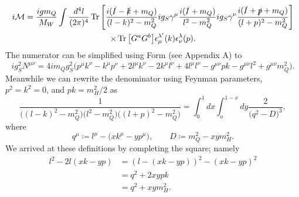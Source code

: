 \begin{gather}
  i\mathcal{M}=\frac{igm_Q}{M_W}\int\frac{d^4l}{(2\pi)^4}\Tr\left[
        \frac{i(\slashed{l}-\slashed{k}+m_Q)}{(l-k)^2-m_Q^2}ig_S\gamma^\mu
        \frac{i(\slashed{l}+m_Q)}{l^2-m_Q^2}ig_S\gamma^\nu
        \frac{i(\slashed{l}+\slashed{p}+m_Q)}{(l+p)^2-m_Q^2}\right] \\
        \times\Tr\big[G^aG^b\big]\epsilon^{\lambda '}_\mu(k)
                           \epsilon^{\lambda }_\nu(p).
\end{gather}
The numerator can be simplified using Form (see Appendix A) to
\begin{equation}
  \label{eq:3num}
  ig_S^2N^{\mu\nu}=4im_Qg_S^2\big(p^\mu k^\nu-k^\mu p^\nu+2l^\mu k^\nu
                     -2k^\mu l^\nu+4l^\mu l^\nu-g^{\mu\nu}pk-g^{\mu\nu}l^2
                     +g^{\mu\nu}m_Q^2\big).
\end{equation}
Meanwhile we can rewrite the denominator using Feynman parameters, $p^2=k^2=0$,
and $pk=m_H^2/2$ as
\begin{equation}
  \frac{1}{\big((l-k)^2-m_Q^2\big)\big(l^2-m_Q^2\big)\big((l+p)^2-m_Q^2\big)}
    =\int_0^1dx\int_o^{1-x}dy\frac{2}{\big(q^2-D\big)^3},
\end{equation}
where
\begin{equation}
  q^\mu\coloneqq l^\mu-\big(xk^\mu-yp^\mu\big),\qquad D\coloneqq m_Q^2-xym_H^2.
\end{equation}
We arrived at these definitions by completing the square; namely
\begin{equation}
  \begin{aligned}
    l^2-2l(xk-yp)&=(l-(xk-yp))^2-(xk-yp)^2 \\
                 &=q^2+2xypk \\
                 &=q^2+xym_H^2.
  \end{aligned}
\end{equation}

